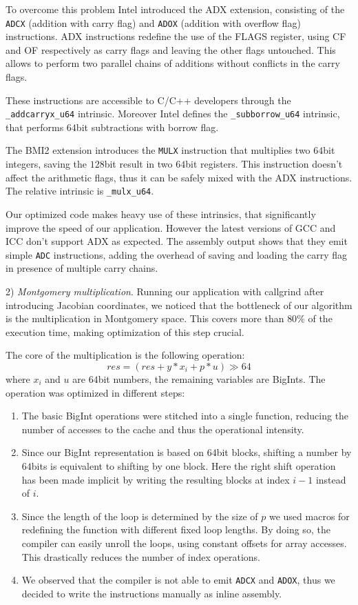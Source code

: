 To overcome this problem Intel introduced the ADX extension, consisting of the \texttt{ADCX} (addition with carry flag) and \texttt{ADOX} (addition with overflow flag) instructions. ADX instructions redefine the use of the FLAGS register, using CF and OF respectively as carry flags and leaving the other flags untouched. This allows to perform two parallel chains of additions without conflicts in the carry flags.

These instructions are accessible to C/C++ developers through the \texttt{\_addcarryx\_u64} intrinsic. Moreover Intel defines the \texttt{\_subborrow\_u64} intrinsic, that performs $64$bit subtractions with borrow flag.

The BMI2 extension introduces the \texttt{MULX} instruction that multiplies two $64$bit integers, saving the $128$bit result in two $64$bit registers. This instruction doesn't affect the arithmetic flags, thus it can be safely mixed with the ADX instructions. The relative intrinsic is \texttt{\_mulx\_u64}. 

Our optimized code makes heavy use of these intrinsics, that significantly improve the speed of our application. However the latest versions of GCC and ICC don't support ADX as expected. The assembly output shows that they emit simple \texttt{ADC} instructions, adding the overhead of saving and loading the carry flag in presence of multiple carry chains.

2) \emph{Montgomery multiplication}.
Running our application with callgrind after introducing Jacobian coordinates, we noticed that the bottleneck of our algorithm is the multiplication in Montgomery space. This covers more than $80\%$ of the execution time, making optimization of this step crucial.
 
The core of the multiplication is the following operation:
$$res = \left(res + y * x_i + p * u\right) \gg 64$$
where $x_i$ and $u$ are $64$bit numbers, the remaining variables are BigInts. The operation was optimized in different steps:
\begin{enumerate}
\item The basic BigInt operations were stitched into a single function, reducing the number of accesses to the cache and thus the operational intensity.
\item Since our BigInt representation is based on $64$bit blocks, shifting a number by $64$bits is equivalent to shifting by one block. Here the right shift operation has been made implicit by writing the resulting blocks at index $i-1$ instead of $i$.
\item Since the length of the loop is determined by the size of $p$ we used macros for redefining the function with different fixed loop lengths. By doing so, the compiler can easily unroll the loops, using constant offsets for array accesses. This drastically reduces the number of index operations. 
\item We observed that the compiler is not able to emit \texttt{ADCX} and \texttt{ADOX}, thus we decided to write the instructions manually as inline assembly. 
\end{enumerate}

